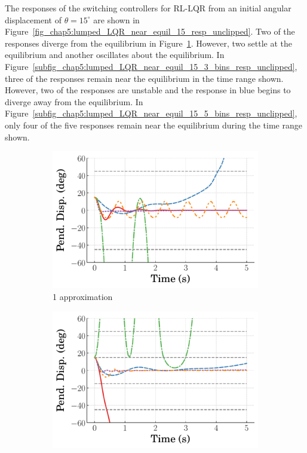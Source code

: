 The responses of the switching controllers for RL-LQR from an initial angular displacement of $\theta=15^\circ$ are shown in Figure~\ref{fig_chap5:lumped_LQR_near_equil_15_resp_unclipped}. Two of the responses diverge from the equilibrium in Figure~\ref{subfig_chap5:lumped_LQR_near_equil_15_1_bins_resp_unclipped}. However, two settle at the equilibrium and another oscillates about the equilibrium. In Figure~\ref{subfig_chap5:lumped_LQR_near_equil_15_3_bins_resp_unclipped}, three of the responses remain near the equilibrium in the time range shown. However, two of the responses are unstable and the response in blue begins to diverge away from the equilibrium. In Figure~\ref{subfig_chap5:lumped_LQR_near_equil_15_5_bins_resp_unclipped}, only four of the five responses remain near the equilibrium during the time range shown.
%
\begin{figure}[tb]
    \centering
    \begin{subfigure}[b]{0.32\textwidth}
        \centering
        \includegraphics[width=\textwidth]{figures/figures_Interpretability/Mean_ISE_Inverted_Pendulum-v0_cubic_1_bins_near_equil/Curve_fit_time_responses/lumped_LQR/curve_fit_Pend_Disp_15.pdf}
        \caption{1 approximation}
        \label{subfig_chap5:lumped_LQR_near_equil_15_1_bins_resp_unclipped}
    \end{subfigure}
    \hfill
    \begin{subfigure}[b]{0.32\textwidth}
        \centering
        \includegraphics[width=\textwidth]{figures/figures_Interpretability/Mean_ISE_Inverted_Pendulum-v0_cubic_3_bins_near_equil/Curve_fit_time_responses/lumped_LQR/curve_fit_Pend_Disp_15.pdf}

\end{subfigure}
\end{figure}
